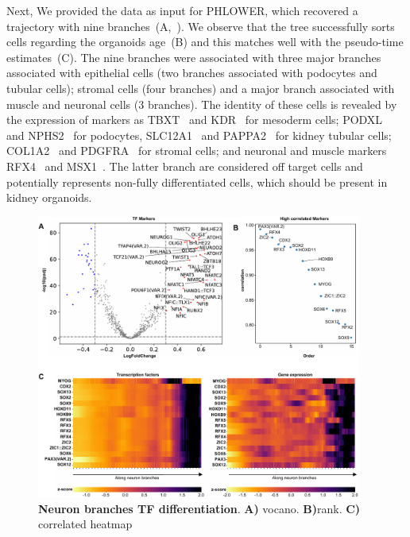 Next, We provided the data as input for PHLOWER, which recovered a trajectory with nine branches~(A,~). We observe that the tree successfully sorts cells regarding the organoids age~(B) and this matches well with the pseudo-time estimates~(C). The nine branches were associated with three major branches associated with epithelial cells (two branches associated with podocytes and tubular cells); stromal cells (four branches) and a major branch associated with muscle and neuronal cells (3 branches). The identity of these cells is revealed by the expression of markers as TBXT~\citep{schmidt2016grow} and KDR~\citep{evseenko2010mapping} for mesoderm cells;  PODXL~\citep{Menon2018} and NPHS2~\citep{Menon2018} for podocytes, SLC12A1~\citep{Hochane2019} and PAPPA2~\citep{Hochane2019} for kidney tubular cells;  COL1A2~\citep{Menon2018} and PDGFRA~\citep{Combes2019} for stromal cells; and neuronal and muscle markers RFX4~\citep{jansen2022sars} and MSX1~\citep{Combes2019,Hochane2019,Menon2018,schmidt2016grow}. The latter branch are considered off target cells and potentially represents non-fully differentiated cells, which should be present in kidney organoids.


\begin{figure}[!h]
	\centering
	\includegraphics[width=0.95\textwidth]{Neuron_TF_diff/fig}
	\vspace{0.1cm}
	\caption[Neuron branches TF differentiation]{\textbf{Neuron branches TF differentiation}. \textbf{A)} vocano. \textbf{B)}rank. \textbf{C)} correlated heatmap}
	\label{fig:Neuron_TF_diff}
\end{figure}


